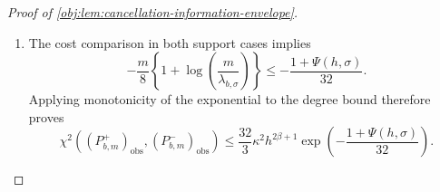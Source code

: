 \begin{proof}[Proof of \cref{obj:lem:cancellation-information-envelope}]
\begin{enumerate}
Finally, suppose that \(\sigma>h\) and \(h<\sigma^4\). The scale identity gives
\[
\sigma^4m^2=4096b^4,
\qquad
b<\sigma^4m^2=4096b^4.
\]
These inequalities force \(b\ge1/16\): if \(b<1/16\), then
\[
b^3\le\frac1{4096},
\qquad
4096b^4\le b,
\]
contradicting the strict inequality above. Therefore
\[
\sqrt h=\frac{\sqrt b}{m}\ge\frac1{4m},
\qquad
h^{-1/2}=\frac1{\sqrt h}\le4m.
\]
On the other hand, \(0<b\le1\) implies
\[
b^3\le1,\qquad b^4\le b,\qquad b^2\le\sqrt b.
\]
Consequently, the logarithm's argument satisfies
\[
0<
\frac{\sigma^2}{\sqrt h}
=\frac{\sigma^2m}{\sqrt b}
=\frac{64b^2}{\sqrt b}
\le64\le256.
\]
Monotonicity of the logarithm and \(1+\log256\ge0\) now give
\[
\begin{aligned}
1+\Psi(h,\sigma)
&=h^{-1/2}\left\{1+\log\!\left(\frac{\sigma^2}{\sqrt h}\right)\right\}\\
&\le h^{-1/2}(1+\log256)\\
&\le4m(1+\log256).
\end{aligned}
\]
Thus every unsaturated branch satisfies
\[
1+\Psi(h,\sigma)
\le
4m\left\{1+\log\!\left(\frac{m}{\lambda_{b,\sigma}}\right)\right\}.
\]
The weak inequalities in the first two branches include their boundary values.

\item The cost comparison in both support cases implies
\[
-\frac m8\left\{1+\log\!\left(\frac{m}{\lambda_{b,\sigma}}\right)\right\}
\le-\frac{1+\Psi(h,\sigma)}{32}.
\]
Applying monotonicity of the exponential to the degree bound therefore proves
\[
\chi^2\!\left((P^+_{b,m})_{\mathrm{obs}},
             (P^-_{b,m})_{\mathrm{obs}}\right)
\le
\frac{32}{3}\kappa^2h^{2\beta+1}
\exp\!\left(-\frac{1+\Psi(h,\sigma)}{32}\right).
\]
\end{enumerate}
\end{proof}
